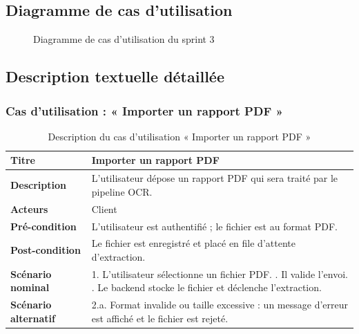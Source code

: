 \subsection{Diagramme de cas d'utilisation}
\begin{figure}[h!]
\centering
{}
\caption{Diagramme de cas d'utilisation du sprint 3}
\end{figure}

\subsection{Description textuelle détaillée}

\subsubsection{Cas d'utilisation : « Importer un rapport PDF »}
\begin{table}[h!]
\centering
\renewcommand{\arraystretch}{1.3}
\begin{tabularx}{\textwidth}{|l|X|}
\hline
\textbf{Titre} & Importer un rapport PDF \\ \hline
\textbf{Description} & L'utilisateur dépose un rapport PDF qui sera traité par le
pipeline OCR. \\ \hline
\textbf{Acteurs} & Client \\ \hline
\textbf{Pré-condition} & L'utilisateur est authentifié ; le fichier est au format
PDF. \\ \hline
\textbf{Post-condition} & Le fichier est enregistré et placé en file d'attente
d'extraction. \\ \hline
\textbf{Scénario nominal} &
1. L'utilisateur sélectionne un fichier PDF. \newline
2. Il valide l'envoi. \newline
3. Le backend stocke le fichier et déclenche l'extraction. \\ \hline
\textbf{Scénario alternatif} &
2.a. Format invalide ou taille excessive : un message d'erreur est affiché et le
fichier est rejeté. \\ \hline
\end{tabularx}
\caption{Description du cas d'utilisation « Importer un rapport PDF »}
\end{table}


